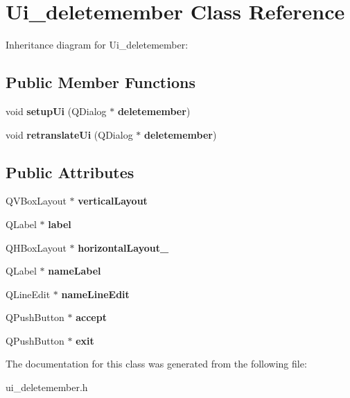 \section{Ui\+\_\+deletemember Class Reference}
\label{class_ui__deletemember}


Inheritance diagram for Ui\+\_\+deletemember\+:
\subsection*{Public Member Functions}
\begin{DoxyCompactItemize}
\item 
\mbox{\label{class_ui__deletemember_a2aee0d2492d1de268a1da7750233308b}} 
void {\bfseries setup\+Ui} (Q\+Dialog $\ast$\textbf{ deletemember})
\item 
\mbox{\label{class_ui__deletemember_a3641aa9fd7f91fd8a51e841f28952c95}} 
void {\bfseries retranslate\+Ui} (Q\+Dialog $\ast$\textbf{ deletemember})
\end{DoxyCompactItemize}
\subsection*{Public Attributes}
\begin{DoxyCompactItemize}
\item 
\mbox{\label{class_ui__deletemember_ab740366d6eebe396757a1ae44b9d66b8}} 
Q\+V\+Box\+Layout $\ast$ {\bfseries vertical\+Layout}
\item 
\mbox{\label{class_ui__deletemember_af5632bc3477a18fe5d3fac08c211eb75}} 
Q\+Label $\ast$ {\bfseries label}
\item 
\mbox{\label{class_ui__deletemember_ac55d2523a48150c86ed9c8117d6da8b2}} 
Q\+H\+Box\+Layout $\ast$ {\bfseries horizontal\+Layout\+\_}
\item 
\mbox{\label{class_ui__deletemember_a1c5a42445b67f18948be31eaae42f11d}} 
Q\+Label $\ast$ {\bfseries name\+Label}
\item 
\mbox{\label{class_ui__deletemember_a12daaa7fa0f3e9cff3a91aa73e993430}} 
Q\+Line\+Edit $\ast$ {\bfseries name\+Line\+Edit}
\item 
\mbox{\label{class_ui__deletemember_a9e160aef3ee6643f2736e35795ce6ffb}} 
Q\+Push\+Button $\ast$ {\bfseries accept}
\item 
\mbox{\label{class_ui__deletemember_ab7f5ffeab0fa972db94704f9f7722408}} 
Q\+Push\+Button $\ast$ {\bfseries exit}
\end{DoxyCompactItemize}


The documentation for this class was generated from the following file\+:\begin{DoxyCompactItemize}
\item 
ui\+\_\+deletemember.\+h\end{DoxyCompactItemize}
